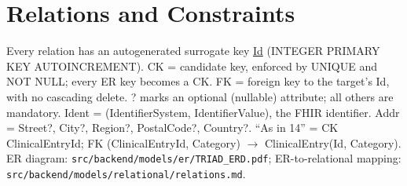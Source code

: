 \documentclass[sigconf]{acmart}
\begin{document}
\clearpage
\onecolumn
\section*{Relations and Constraints}
\footnotesize
Every relation has an autogenerated surrogate key \underline{Id} (INTEGER PRIMARY KEY AUTOINCREMENT). CK = candidate key, enforced by UNIQUE and NOT NULL; every ER key becomes a CK. FK = foreign key to the target's Id, with no cascading delete. ? marks an optional (nullable) attribute; all others are mandatory. Ident = (IdentifierSystem, IdentifierValue), the FHIR identifier. Addr = Street?, City?, Region?, PostalCode?, Country?. ``As in 14'' = CK ClinicalEntryId; FK (ClinicalEntryId, Category) $\to$ ClinicalEntry(Id, Category). ER diagram: \texttt{src/backend/models/er/TRIAD\_ERD.pdf}; ER-to-relational mapping: \texttt{src/backend/models/relational/relations.md}.
\end{document}
